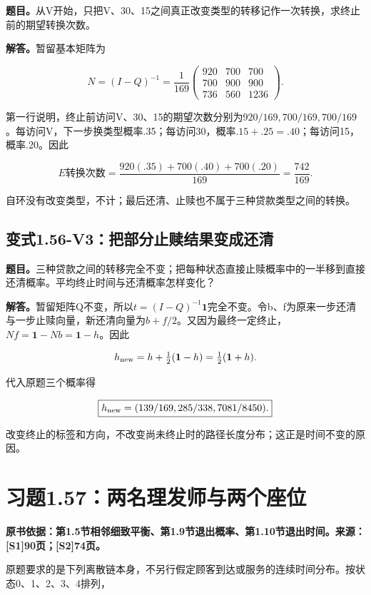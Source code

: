 \documentclass[
  11pt,
  a4paper,
  UTF8,
  fontset=fandol]{ctexart}
\begin{document}
\textbf{题目。}从V开始，只把V、30、15之间真正改变类型的转移记作一次转换，求终止前的期望转换次数。

\textbf{解答。}暂留基本矩阵为

\[
N=(I-Q)^{-1}=\frac1{169}\begin{pmatrix}
920&700&700\\700&900&900\\736&560&1236
\end{pmatrix}.
\]

第一行说明，终止前访问V、30、15的期望次数分别为\(920/169,700/169,700/169\)。每访问V，下一步换类型概率.35；每访问30，概率\(.15+.25=.40\)；每访问15，概率.20。因此

\[
\boxed{E\text{转换次数}=\frac{920(.35)+700(.40)+700(.20)}{169}=\frac{742}{169}.}
\]

自环没有改变类型，不计；最后还清、止赎也不属于三种贷款类型之间的转换。

\subsection{变式1.56-V3：把部分止赎结果变成还清}\label{ux53d8ux5f0f1.56-v3ux628aux90e8ux5206ux6b62ux8d4eux7ed3ux679cux53d8ux6210ux8fd8ux6e05}

\textbf{题目。}三种贷款之间的转移完全不变；把每种状态直接止赎概率中的一半移到直接还清概率。平均终止时间与还清概率怎样变化？

\textbf{解答。}暂留矩阵Q不变，所以\(t=(I-Q)^{-1}\boldsymbol1\)完全不变。令b、f为原来一步还清与一步止赎向量，新还清向量为\(b+f/2\)。又因为最终一定终止，\(Nf=\boldsymbol1-Nb=\boldsymbol1-h\)。因此

\[
h_{\rm new}=h+\tfrac12(\boldsymbol1-h)=\tfrac12(\boldsymbol1+h).
\]

代入原题三个概率得

\[
\boxed{h_{\rm new}=(139/169,285/338,7081/8450).}
\]

改变终止的标签和方向，不改变尚未终止时的路径长度分布；这正是时间不变的原因。

\section{习题1.57：两名理发师与两个座位}\label{ux4e60ux98981.57ux4e24ux540dux7406ux53d1ux5e08ux4e0eux4e24ux4e2aux5ea7ux4f4d}

\textbf{原书依据：第1.5节相邻细致平衡、第1.9节退出概率、第1.10节退出时间。来源：{[}S1{]}90页；{[}S2{]}74页。}

原题要求的是下列离散链本身，不另行假定顾客到达或服务的连续时间分布。按状态0、1、2、3、4排列，
\end{document}
